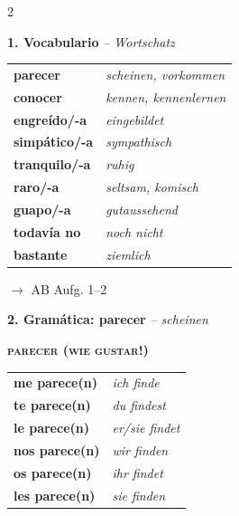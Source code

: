 \documentclass[11pt, a4paper]{article}
\newcommand{\seriftext}[1]{{\fontfamily{ppl}\selectfont #1}}
\newcommand{\es}[1]{\seriftext{\textbf{#1}}}
\newcommand{\de}[1]{\textit{\textcolor{akzent}{#1}}}
\newcommand{\gram}[1]{\textsc{#1}}
\newcommand{\abmark}[1]{{\footnotesize\textcolor{akzent}{$\rightarrow$ AB #1}}}
\newcommand{\abschnitt}[2]{\noindent\textbf{\large #1. #2}}
\begin{document}
\begin{multicols}{2}

\abschnitt{1}{Vocabulario} \de{-- Wortschatz}

\vspace{4pt}

\begin{tabular}{@{}ll@{}}
\es{parecer} & \de{scheinen, vorkommen} \\[0.4em]
\es{conocer} & \de{kennen, kennenlernen} \\[0.4em]
\midrule
\es{engreído/-a} & \de{eingebildet} \\[0.4em]
\es{simpático/-a} & \de{sympathisch} \\[0.4em]
\es{tranquilo/-a} & \de{ruhig} \\[0.4em]
\es{raro/-a} & \de{seltsam, komisch} \\[0.4em]
\es{guapo/-a} & \de{gutaussehend} \\[0.4em]
\midrule
\es{todavía no} & \de{noch nicht} \\[0.4em]
\es{bastante} & \de{ziemlich} \\
\end{tabular}

\vspace{4pt}

\abmark{Aufg. 1--2}

\vspace{8pt}

\abschnitt{2}{Gramática: parecer} \de{-- scheinen}

\vspace{4pt}

\begin{grammatikbox}
\textbf{\gram{parecer (wie gustar!)}}

\vspace{3pt}
{\small
\begin{tabular}{@{}ll@{}}
\es{me parece(n)} & \de{ich finde} \\[0.3em]
\es{te parece(n)} & \de{du findest} \\[0.3em]
\es{le parece(n)} & \de{er/sie findet} \\[0.3em]
\es{nos parece(n)} & \de{wir finden} \\[0.3em]
\es{os parece(n)} & \de{ihr findet} \\[0.3em]
\es{les parece(n)} & \de{sie finden} \\
\end{tabular}}
\end{grammatikbox}


\end{multicols}
\end{document}
